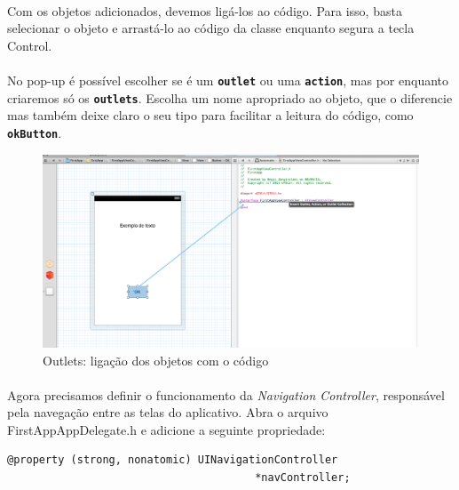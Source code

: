 \documentclass[a4paper,12pt,brazil,doubleside]{book}
\begin{document}
\paragraph{}Com os objetos adicionados, devemos ligá-los ao código. Para isso, basta selecionar o objeto e arrastá-lo ao código da classe enquanto segura a tecla Control.
\paragraph{}No pop-up é possível escolher se é um \texttt{\textbf{outlet}} ou uma \texttt{\textbf{action}}, mas por enquanto criaremos só os \texttt{\textbf{outlets}}. Escolha um nome apropriado ao objeto, que o diferencie mas também deixe claro o seu tipo para facilitar a leitura do código, como \texttt{\textbf{okButton}}.

\begin{figure}[h]
  \centering
  \includegraphics[totalheight=0.3\textheight]{figuras/1/link_outlet_button.png}
  \caption{Outlets: ligação dos objetos com o código}
  \label{fig:a}
\end{figure}

\paragraph{}Agora precisamos definir o funcionamento da \emph{Navigation Controller}, responsável pela navegação entre as telas do aplicativo. Abra o arquivo FirstAppAppDelegate.h e adicione a seguinte propriedade:

\begin{listing}
\begin{verbatim}
@property (strong, nonatomic) UINavigationController
									   *navController;
\end{verbatim}
\end{listing}
\end{document}
